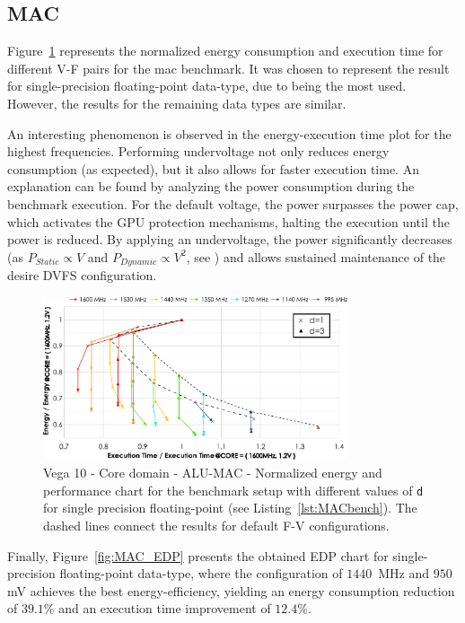 \subsection{MAC}

\label{sec:MAC_behaviour}
Figure~\ref{fig:MAC_behaviour} represents the normalized energy consumption and execution time for different V-F pairs for the \acrshort{mac} benchmark. It was chosen to represent the result for single-precision floating-point data-type, due to being the most used. However, the results for the remaining data types are similar.

An interesting phenomenon is observed in the energy-execution time plot for the highest frequencies. Performing undervoltage not only reduces energy consumption (as expected), but it also allows for faster execution time. An explanation can be found by analyzing the power consumption during the benchmark execution. For the default voltage, the power surpasses the power cap, which activates the GPU protection mechanisms, halting the execution until the power is reduced. By applying an undervoltage, the power significantly decreases (as $P_{Static}\propto V$ and $P_{Dynamic}\propto V^2$, see \cite{guerreiro_gpgpu_2018}) and allows sustained maintenance of the desire DVFS configuration. 

\begin{figure}[htb]
  \centering
  \includegraphics[width=0.8\textwidth]{Figures/GPU_characterization/MAC_behaviour_d_1_3.pdf}
  \caption{Vega 10 - Core domain - ALU-MAC - Normalized energy and performance chart for the benchmark setup with different values of \texttt{d} for single precision floating-point (see Listing~\ref{lst:MACbench}). The dashed lines connect the results for default F-V configurations.}
  \label{fig:MAC_behaviour}
\end{figure}

Finally, Figure~\ref{fig:MAC_EDP} presents the obtained EDP chart for single-precision floating-point data-type, where the configuration of $1440$~MHz and $950$mV achieves the best energy-efficiency, yielding an energy consumption reduction of $39.1\%$ and an execution time improvement of $12.4\%$.

